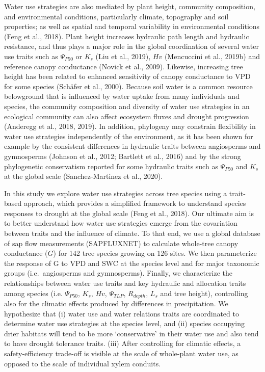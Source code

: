 \documentclass[11pt,twoside]{reedthesis}
\begin{document}
Water use strategies are also mediated by plant height, community
composition, and environmental conditions, particularly climate,
topography and soil properties; as well as spatial and temporal
variability in environmental conditions (Feng et al., 2018). Plant
height increases hydraulic path length and hydraulic resistance, and
thus plays a major role in the global coordination of several water use
traits such as \(\Psi_{P50}\) or \(K_s\) (Liu et al., 2019), \(Hv\)
(Mencuccini et al., 2019b) and reference canopy conductance (Novick et
al., 2009). Likewise, increasing tree height has been related to
enhanced sensitivity of canopy conductance to VPD for some species
(Schäfer et al., 2000). Because soil water is a common resource
belowground that is influenced by water uptake from many individuals and
species, the community composition and diversity of water use strategies
in an ecological community can also affect ecosystem fluxes and drought
progression (Anderegg et al., 2018, 2019). In addition, phylogeny may
constrain flexibility in water use strategies independently of the
environment, as it has been shown for example by the consistent
differences in hydraulic traits between angiosperms and gymnosperms
(Johnson et al., 2012; Bartlett et al., 2016) and by the strong
phylogenetic conservatism reported for some hydraulic traits such as
\(\Psi_{P50}\) and \(K_s\) at the global scale (Sanchez‐Martinez et al.,
2020).\par

In this study we explore water use strategies across tree species using
a trait-based approach, which provides a simplified framework to
understand species responses to drought at the global scale (Feng et
al., 2018). Our ultimate aim is to better understand how water use
strategies emerge from the covariation between traits and the influence
of climate. To that end, we use a global database of sap flow
measurements (SAPFLUXNET) to calculate whole-tree canopy conductance
(\(G\)) for 142 tree species growing on 126 sites. We then parameterize
the response of G to VPD and SWC at the species level and for major
taxonomic groups (i.e.~angiosperms and gymnosperms). Finally, we
characterize the relationships between water use traits and key
hydraulic and allocation traits among species (i.e. \(\Psi_{P50}\),
\(K_s\), \(Hv\), \(\Psi_{TLP}\), \(R_{depth}\), \(L_s\) and tree
height), controlling also for the climatic effects produced by
differences in precipitation. We hypothesize that (i) water use and
water relations traits are coordinated to determine water use strategies
at the species level, and (ii) species occupying drier habitats will
tend to be more `conservative' in their water use and also tend to have
drought tolerance traits. (iii) After controlling for climatic effects,
a safety-efficiency trade-off is visible at the scale of whole-plant
water use, as opposed to the scale of individual xylem conduits.\par
\end{document}
